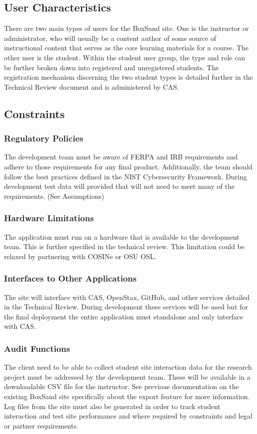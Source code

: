 \documentclass[onecolumn, draftclsnofoot,10pt, compsoc]{IEEEtran}
\begin{document}
\subsection{User Characteristics}
There are two main types of users for the BoxSand site. One is the instructor or administrator, who will usually be a content author of some source of instructional content that serves as the core learning materials for a course. The other user is the student. Within the student user group, the type and role can be further broken down into registered and unregistered students. The registration mechanism discerning the two student types is detailed further in the Technical Review document and is administered by CAS.

\subsection{Constraints}

\subsubsection{Regulatory Policies}
The development team must be aware of FERPA and IRB requirements and adhere to those requirements for any final product. Additionally, the team should follow the best practices defined in the NIST Cybersecurity Framework. During development test data will provided that will not need to meet many of the requirements. (See Assumptions)

\subsubsection{Hardware Limitations}
The application must run on a hardware that is available to the development team. This is further specified in the technical review. This limitation could be relaxed by partnering with COSINe or OSU OSL. 

\subsubsection{Interfaces to Other Applications}
The site will interface with CAS, OpenStax, GitHub, and other services detailed in the Technical Review. During development these services will be used but for the final deployment the entire application must standalone and only interface with CAS. 

\subsubsection{Audit Functions}
The client need to be able to collect student site interaction data for the research project must be addressed by the development team. These will be available in a downloadable CSV file for the instructor. See previous documentation on the existing BoxSand site specifically about the export feature for more information. Log files from the site must also be generated in order to track student interaction and test site performance and where required by constraints and legal or partner requirements.
\end{document}
